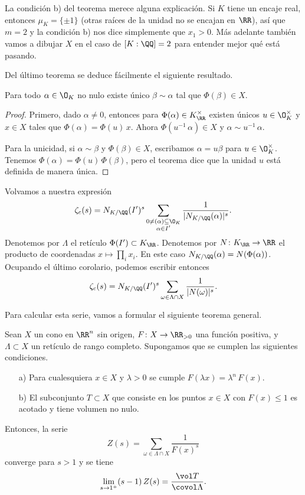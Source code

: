 La condición b) del teorema merece alguna explicación. Si $K$ tiene un encaje
real, entonces $\mu_K = \{ \pm 1 \}$ (otras raíces de la unidad no se encajan en
$\RR$), así que $m = 2$ y la condición b) nos dice simplemente que $x_1 > 0$.
Más adelante también vamos a dibujar $X$ en el caso de $[K : \QQ] = 2$ para
entender mejor qué está pasando.

Del último teorema se deduce fácilmente el siguiente resultado.

\begin{corolario}
  Para todo $\alpha \in \O_K$ no nulo existe único $\beta \sim \alpha$ tal que
  $\Phi (\beta) \in X$.

  \begin{proof}
    Primero, dado $\alpha \ne 0$, entonces para $\Phi (\alpha) \in K_\RR^\times$
    existen únicos $u \in \O_K^\times$ y $x \in X$ tales que
    $\Phi (\alpha) = \Phi (u)\,x$. Ahora $\Phi (u^{-1}\,\alpha) \in X$ y
    $\alpha \sim u^{-1}\,\alpha$.

    Para la unicidad, si $\alpha \sim \beta$ y $\Phi (\beta) \in X$, escribamos
    $\alpha = u\beta$ para $u \in \O_K^\times$. Tenemos
    $\Phi (\alpha) = \Phi (u)\,\Phi (\beta)$, pero el teorema dice que la unidad
    $u$ está definida de manera única.
  \end{proof}
\end{corolario}

Volvamos a nuestra expresión
$$\zeta_c (s) = N_{K/\QQ} (I')^s \sum_{\substack{0 \ne (\alpha) \subseteq \O_K \\ \alpha \in I'}} \frac{1}{|N_{K/\QQ} (\alpha)|^s}.$$
Denotemos por $\Lambda$ el retículo $\Phi (I') \subset K_\RR$. Denotemos por
$N\colon K_\RR \to \RR$ el producto de coordenadas $x \mapsto \prod_i x_i$.
En este caso $N_{K/\QQ} (\alpha) = N (\Phi (\alpha))$. Ocupando el último
corolario, podemos escribir entonces
$$\zeta_c (s) = N_{K/\QQ} (I')^s \sum_{\omega \in \Lambda \cap X} \frac{1}{|N (\omega)|^s}.$$

Para calcular esta serie, vamos a formular el siguiente teorema general.

\begin{teorema}
  \label{thm:residuo-de-Z(s)}
  Sean $X$ un cono en $\RR^n$ sin origen, $F\colon X\to \RR_{>0}$ una función
  positiva, y $\Lambda \subset X$ un retículo de rango completo. Supongamos que
  se cumplen las siguientes condiciones.
  \begin{enumerate}
  \item[a)] Para cualesquiera $x \in X$ y $\lambda > 0$ se cumple
    $F (\lambda x) = \lambda^n\,F (x)$.

  \item[b)] El subconjunto $T \subset X$ que consiste en los puntos $x \in X$
    con $F (x) \le 1$ es acotado y tiene volumen no nulo.
  \end{enumerate}
  Entonces, la serie
  $$Z (s) = \sum_{\omega \in \Lambda \cap X} \frac{1}{F (x)^s}$$
  converge para $s > 1$ y se tiene
  $$\lim_{s \to 1^+} (s-1)\,Z (s) = \frac{\vol T}{\covol \Lambda}.$$
\end{teorema}


